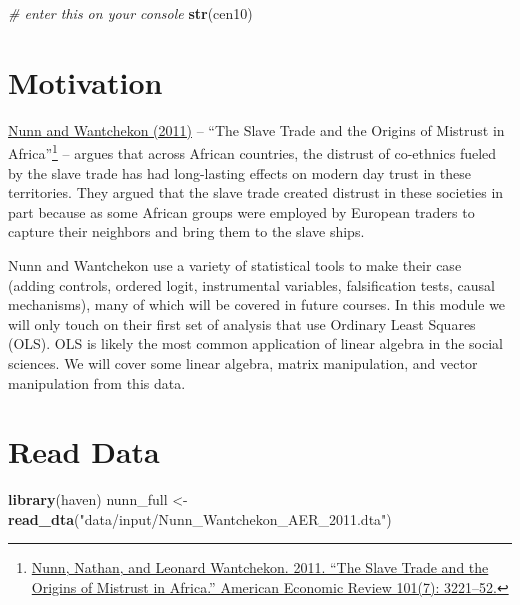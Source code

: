 \documentclass[]{book}
\newenvironment{Shaded}{\begin{snugshade}}{\end{snugshade}}
\newcommand{\KeywordTok}[1]{\textcolor[rgb]{0.13,0.29,0.53}{\textbf{#1}}}
\newcommand{\StringTok}[1]{\textcolor[rgb]{0.31,0.60,0.02}{#1}}
\newcommand{\CommentTok}[1]{\textcolor[rgb]{0.56,0.35,0.01}{\textit{#1}}}
\newcommand{\NormalTok}[1]{#1}
\let\rmarkdownfootnote\footnote%
\def\footnote{\protect\rmarkdownfootnote}
\theoremstyle{definition}
\theoremstyle{definition}
\theoremstyle{definition}
\theoremstyle{remark}
\begin{document}
\begin{Shaded}
\begin{Highlighting}[]
\CommentTok{# enter this on your console}
\KeywordTok{str}\NormalTok{(cen10)}
\end{Highlighting}
\end{Shaded}

\section{Motivation}\label{motivation}

\href{https://dash.harvard.edu/bitstream/handle/1/11986331/nunn-slave-trade.pdf}{Nunn
and Wantchekon (2011)} -- ``The Slave Trade and the Origins of Mistrust
in Africa''\footnote{\href{https://dash.harvard.edu/bitstream/handle/1/11986331/nunn-slave-trade.pdf}{Nunn,
  Nathan, and Leonard Wantchekon. 2011. ``The Slave Trade and the
  Origins of Mistrust in Africa.'' American Economic Review 101(7):
  3221--52.}} -- argues that across African countries, the distrust of
co-ethnics fueled by the slave trade has had long-lasting effects on
modern day trust in these territories. They argued that the slave trade
created distrust in these societies in part because as some African
groups were employed by European traders to capture their neighbors and
bring them to the slave ships.

Nunn and Wantchekon use a variety of statistical tools to make their
case (adding controls, ordered logit, instrumental variables,
falsification tests, causal mechanisms), many of which will be covered
in future courses. In this module we will only touch on their first set
of analysis that use Ordinary Least Squares (OLS). OLS is likely the
most common application of linear algebra in the social sciences. We
will cover some linear algebra, matrix manipulation, and vector
manipulation from this data.

\section{Read Data}\label{read-data-1}

\begin{Shaded}
\begin{Highlighting}[]
\KeywordTok{library}\NormalTok{(haven)}
\NormalTok{nunn_full <-}\StringTok{ }\KeywordTok{read_dta}\NormalTok{(}\StringTok{"data/input/Nunn_Wantchekon_AER_2011.dta"}\NormalTok{)}
\end{Highlighting}
\end{Shaded}
\end{document}
